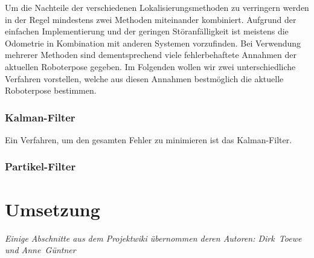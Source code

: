 Um die Nachteile der verschiedenen Lokalisierungsmethoden zu
 verringern werden in der Regel mindestens zwei Methoden miteinander
 kombiniert. Aufgrund der einfachen Implementierung und der geringen
 Störanfälligkeit ist meistens die Odometrie in Kombination mit
 anderen Systemen vorzufinden. Bei Verwendung mehrerer Methoden sind
 dementsprechend viele fehlerbehaftete Annahmen der aktuellen
 Roboterpose gegeben. Im Folgenden wollen wir zwei unterschiedliche
 Verfahren vorstellen, welche aus diesen Annahmen bestmöglich die
 aktuelle Roboterpose bestimmen.
 
\subsubsection{Kalman-Filter}
  Ein Verfahren, um den gesamten Fehler zu minimieren ist das
  Kalman-Filter.
\subsubsection{Partikel-Filter}
 
\section{Umsetzung}
\label{lokalisierung_umsetzung_sec}
\authorsection{\editorandreas}
\begin{flushright}\textit{Einige Abschnitte aus dem Projektwiki übernommen deren
Autoren: Dirk~Toewe und Anne~Güntner}\end{flushright}
